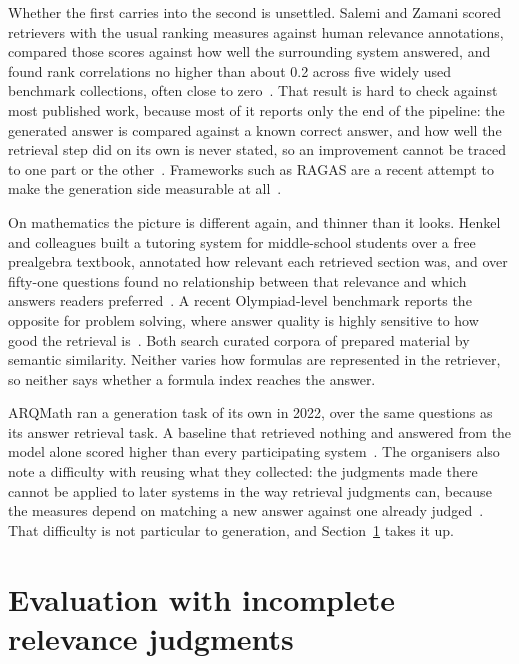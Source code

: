 Whether the first carries into the second is unsettled. Salemi and Zamani scored
retrievers with the usual ranking measures against human relevance annotations, compared
those scores against how well the surrounding system answered, and found rank
correlations no higher than about 0.2 across five widely used benchmark collections,
often close to zero~\cite{salemi2024erag}. That result is hard to check against most
published work, because most of it reports only the end of the pipeline: the generated
answer is compared against a known correct answer, and how well the retrieval step did on
its own is never stated, so an improvement cannot be traced to one part or the
other~\cite{salemi2024erag}. Frameworks such as RAGAS are a recent
attempt to make the generation side measurable at all~\cite{es2024ragas}.

On mathematics the picture is different again, and thinner than it looks. Henkel and
colleagues built a tutoring system for middle-school students over a free prealgebra
textbook, annotated how relevant each retrieved section was, and over fifty-one questions
found no relationship between that relevance and which answers readers
preferred~\cite{henkel2024mathrag}. A recent Olympiad-level benchmark reports the
opposite for problem solving, where answer quality is highly sensitive to how good the
retrieval is~\cite{alshammari2026mathnet}. Both search curated corpora of prepared
material by semantic similarity. Neither varies how formulas are represented in the
retriever, so neither says whether a formula index reaches the answer.

ARQMath ran a generation task of its own in 2022, over the same questions as its answer
retrieval task. A baseline that retrieved nothing and answered from the model alone
scored higher than every participating system~\cite{mansouri2022arqmath3}. The organisers
also note a difficulty with reusing what they collected: the judgments made there cannot
be applied to later systems in the way retrieval judgments can, because the measures
depend on matching a new answer against one already judged~\cite{mansouri2022arqmath3}.
That difficulty is not particular to generation, and
Section~\ref{sec:rw-incomplete-judgments} takes it up.


\section{Evaluation with incomplete relevance judgments}\label{sec:rw-incomplete-judgments}

